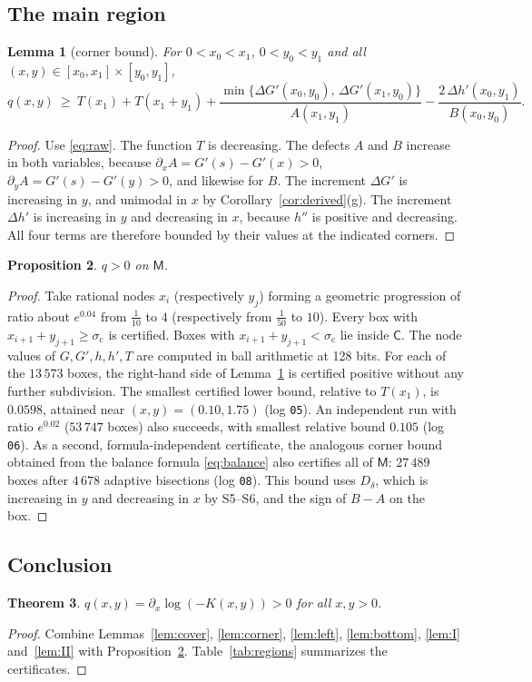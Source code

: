 \documentclass[11pt,a4paper]{article}
\newtheorem{theorem}{Theorem}[section]
\newtheorem{proposition}[theorem]{Proposition}
\newtheorem{lemma}[theorem]{Lemma}
\theoremstyle{definition}
\theoremstyle{remark}
\newcommand{\sig}{\sigma_{\mathrm c}}
\begin{document}
\subsection{The main region}
\begin{lemma}[corner bound]\label{lem:box}
For $0<x_0<x_1$, $0<y_0<y_1$ and all $(x,y)\in[x_0,x_1]\times[y_0,y_1]$,
\[
q(x,y)\ \ge\ T(x_1)+T(x_1+y_1)+\frac{\min\{\Delta G'(x_0,y_0),\,\Delta G'(x_1,y_0)\}}{A(x_1,y_1)}-\frac{2\,\Delta h'(x_0,y_1)}{B(x_0,y_0)} .
\]
\end{lemma}
\begin{proof}
Use \eqref{eq:raw}. The function $T$ is decreasing. The defects $A$ and $B$ increase in both variables, because $\partial_xA=G'(s)-G'(x)>0$, $\partial_yA=G'(s)-G'(y)>0$, and likewise for $B$. The increment $\Delta G'$ is increasing in $y$, and unimodal in $x$ by Corollary~\ref{cor:derived}(g). The increment $\Delta h'$ is increasing in $y$ and decreasing in $x$, because $h''$ is positive and decreasing. All four terms are therefore bounded by their values at the indicated corners.
\end{proof}

\begin{proposition}\label{prop:main}
$q>0$ on $\mathsf M$.
\end{proposition}
\begin{proof}
Take rational nodes $x_i$ (respectively $y_j$) forming a geometric progression of ratio about $e^{0.04}$ from $\frac1{10}$ to $4$ (respectively from $\frac1{50}$ to $10$). Every box with $x_{i+1}+y_{j+1}\ge\sig$ is certified. Boxes with $x_{i+1}+y_{j+1}<\sig$ lie inside $\mathsf C$. The node values of $G,G',h,h',T$ are computed in ball arithmetic at 128 bits. For each of the $13\,573$ boxes, the right-hand side of Lemma~\ref{lem:box} is certified positive without any further subdivision. The smallest certified lower bound, relative to $T(x_1)$, is $0.0598$, attained near $(x,y)=(0.10,1.75)$ (log \texttt{05}). An independent run with ratio $e^{0.02}$ ($53\,747$ boxes) also succeeds, with smallest relative bound $0.105$ (log \texttt{06}). As a second, formula-independent certificate, the analogous corner bound obtained from the balance formula \eqref{eq:balance} also certifies all of $\mathsf M$: $27\,489$ boxes after $4\,678$ adaptive bisections (log \texttt{08}). This bound uses $D_\delta$, which is increasing in $y$ and decreasing in $x$ by S5--S6, and the sign of $B-A$ on the box.
\end{proof}

\subsection{Conclusion}
\begin{theorem}\label{thm:qpos}
$q(x,y)=\partial_x\log(-K(x,y))>0$ for all $x,y>0$.
\end{theorem}
\begin{proof}
Combine Lemmas~\ref{lem:cover}, \ref{lem:corner}, \ref{lem:left}, \ref{lem:bottom}, \ref{lem:I} and~\ref{lem:II} with Proposition~\ref{prop:main}. Table~\ref{tab:regions} summarizes the certificates.
\end{proof}
\end{document}
